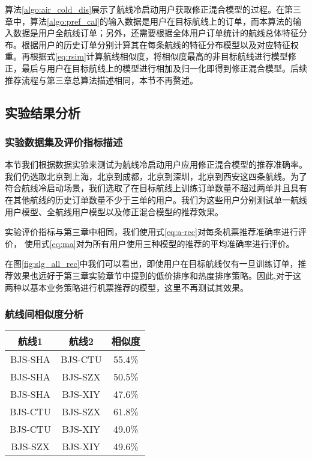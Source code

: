 算法\ref{algo:air_cold_dis}展示了航线冷启动用户获取修正混合模型的过程。在第三章中，算法\ref{algo:pref_cal}的输入数据是用户在目标航线上的订单，而本算法的输入数据是用户全航线订单；另外，还需要根据全体用户订单统计的航线总体特征分布。根据用户的历史订单分别计算其在每条航线的特征分布模型以及对应特征权重。再根据式\ref{eq:rsim}计算航线相似度，将相似度最高的非目标航线进行模型修正，最后与用户在目标航线上的模型进行相加及归一化即得到修正混合模型。后续推荐流程与第三章总算法描述相同，本节不再赘述。

\subsection{实验结果分析}

\subsubsection{实验数据集及评价指标描述}

本节我们根据数据实验来测试为航线冷启动用户应用修正混合模型的推荐准确率。
我们仍选取北京到上海，北京到成都，北京到深圳，北京到西安这四条航线。为了符合航线冷启动场景，我们选取了在目标航线上训练订单数量不超过两单并且具有在其他航线的历史订单数量不少于三单的用户。我们为这些用户分别测试单一航线用户模型、全航线用户模型以及修正混合模型的推荐效果。

实验评价指标与第三章中相同，我们使用式\ref{eq:a-rec}对每条机票推荐准确率进行评价，
使用式\ref{eq:ma}对为所有用户使用三种模型的推荐的平均准确率进行评价。

在图\ref{fig:slg_all_rec}中我们可以看出，即使用户在目标航线仅有一旦训练订单，推荐效果也远好于第三章实验章节中提到的低价排序和热度排序策略。因此,对于这两种以基本业务策略进行机票推荐的模型，这里不再测试其效果。

\subsubsection{航线间相似度分析}

\begin{table}[!hpb]
  \centering
  \begin{tabular}{|c|c|c|} \hline 
    航线1& 航线2 & 相似度\\ \hline
    BJS-SHA & BJS-CTU & 55.4\% \\ \hline
    BJS-SHA & BJS-SZX & 50.5\% \\ \hline
    BJS-SHA & BJS-XIY & 47.6\% \\ \hline
    BJS-CTU & BJS-SZX & 61.8\% \\ \hline
    BJS-CTU & BJS-XIY & 49.0\% \\ \hline
    BJS-SZX & BJS-XIY & 49.6\% \\ \hline
  \end{tabular}
\end{table}

